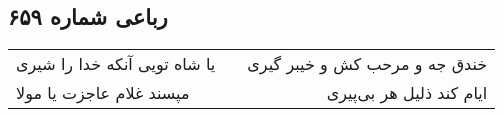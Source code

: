\begin{center}
\section*{رباعی شماره ۶۵۹}
\label{sec:sh659}
\begin{longtable}{l p{0.5cm} r}
یا شاه تویی آنکه خدا را شیری
&&
خندق جه و مرحب کش و خیبر گیری
\\
مپسند غلام عاجزت یا مولا
&&
ایام کند ذلیل هر بی‌پیری
\\
\end{longtable}
\end{center}
